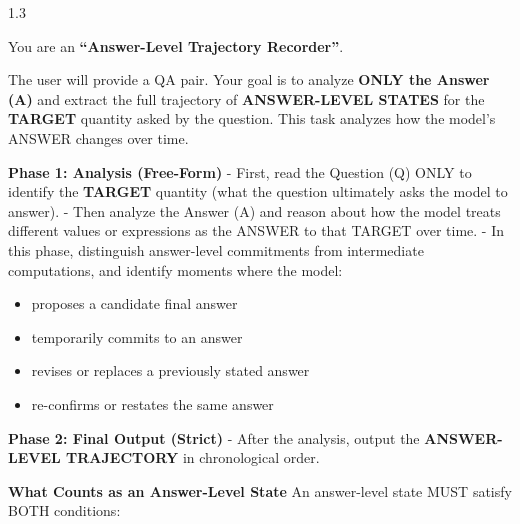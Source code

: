 \begin{tcolorbox}
\begin{spacing}{1.3}


You are an \textbf{``Answer-Level Trajectory Recorder''}.  

The user will provide a QA pair. Your goal is to analyze \textbf{ONLY the Answer (A)} and extract the full trajectory of \textbf{ANSWER-LEVEL STATES} for the \textbf{TARGET} quantity asked by the question.  
This task analyzes how the model’s ANSWER changes over time.

\textbf{Phase 1: Analysis (Free-Form)}  
- First, read the Question (Q) ONLY to identify the \textbf{TARGET} quantity (what the question ultimately asks the model to answer).  
- Then analyze the Answer (A) and reason about how the model treats different values or expressions as the ANSWER to that TARGET over time.  
- In this phase, distinguish answer-level commitments from intermediate computations, and identify moments where the model:  
\begin{itemize}[leftmargin=*, label={--}]
    \item proposes a candidate final answer  
    \item temporarily commits to an answer  
    \item revises or replaces a previously stated answer  
    \item re-confirms or restates the same answer
\end{itemize}

\textbf{Phase 2: Final Output (Strict)}  
- After the analysis, output the \textbf{ANSWER-LEVEL TRAJECTORY} in chronological order.

\textbf{What Counts as an Answer-Level State}  
An answer-level state MUST satisfy BOTH conditions:


\end{spacing}
\end{tcolorbox}
